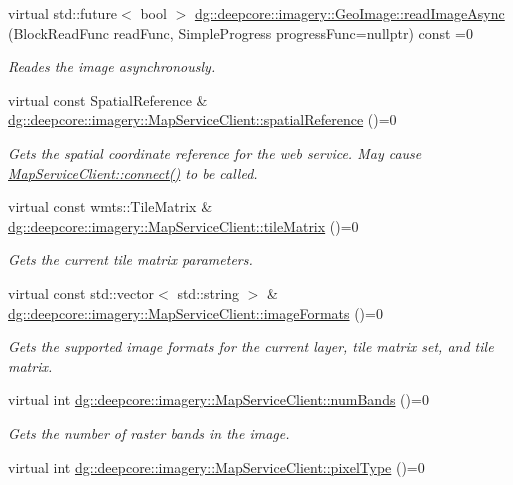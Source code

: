 \begin{DoxyCompactItemize}
virtual std\+::future$<$ bool $>$ \hyperlink{group___imagery_module_ga546feafefa76af28c13edab7a92e1cee}{dg\+::deepcore\+::imagery\+::\+Geo\+Image\+::read\+Image\+Async} (Block\+Read\+Func read\+Func, Simple\+Progress progress\+Func=nullptr) const =0
\begin{DoxyCompactList}\small\item\em Reades the image asynchronously. \end{DoxyCompactList}\item 
virtual const Spatial\+Reference \& \hyperlink{group___imagery_module_gadfaf375c95456bdf445d774f5dd24bbc}{dg\+::deepcore\+::imagery\+::\+Map\+Service\+Client\+::spatial\+Reference} ()=0
\begin{DoxyCompactList}\small\item\em Gets the spatial coordinate reference for the web service. May cause \hyperlink{group___imagery_module_ga5e5f58c725cafba7966936f688a6ade0}{Map\+Service\+Client\+::connect()} to be called. \end{DoxyCompactList}\item 
virtual const wmts\+::\+Tile\+Matrix \& \hyperlink{group___imagery_module_ga0f308a2d98dc9f34b8ca651576265449}{dg\+::deepcore\+::imagery\+::\+Map\+Service\+Client\+::tile\+Matrix} ()=0
\begin{DoxyCompactList}\small\item\em Gets the current tile matrix parameters. \end{DoxyCompactList}\item 
virtual const std\+::vector$<$ std\+::string $>$ \& \hyperlink{group___imagery_module_ga48b6f633e02c44d955b4d4b1b8352b57}{dg\+::deepcore\+::imagery\+::\+Map\+Service\+Client\+::image\+Formats} ()=0
\begin{DoxyCompactList}\small\item\em Gets the supported image formats for the current layer, tile matrix set, and tile matrix. \end{DoxyCompactList}\item 
virtual int \hyperlink{group___imagery_module_ga7b7d8333be9d5386d8ddca5148b041b5}{dg\+::deepcore\+::imagery\+::\+Map\+Service\+Client\+::num\+Bands} ()=0
\begin{DoxyCompactList}\small\item\em Gets the number of raster bands in the image. \end{DoxyCompactList}\item 
virtual int \hyperlink{group___imagery_module_gaa94fd511ae5e578357ceba16a9039b51}{dg\+::deepcore\+::imagery\+::\+Map\+Service\+Client\+::pixel\+Type} ()=0

\end{DoxyCompactItemize}
